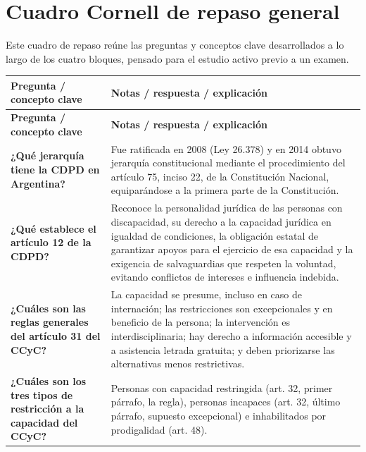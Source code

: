 \documentclass[12pt,oneside]{book}
\begin{document}
\section{Cuadro Cornell de repaso general}
\label{ch:cornell-general}

Este cuadro de repaso reúne las preguntas y conceptos clave desarrollados a lo largo de los cuatro bloques, pensado para el estudio activo previo a un examen.

\begin{longtable}{
    >{\raggedright\arraybackslash}p{}
    >{\raggedright\arraybackslash}p{}
}
\toprule
\textbf{Pregunta / concepto clave} & \textbf{Notas / respuesta / explicación} \\
\midrule
\endfirsthead
\toprule
\textbf{Pregunta / concepto clave} & \textbf{Notas / respuesta / explicación} \\
\midrule
\endhead

\textbf{¿Qué jerarquía tiene la CDPD en Argentina?} &
Fue ratificada en 2008 (Ley 26.378) y en 2014 obtuvo jerarquía constitucional mediante el procedimiento del artículo 75, inciso 22, de la Constitución Nacional, equiparándose a la primera parte de la Constitución. \\[0.4em]

\textbf{¿Qué establece el artículo 12 de la CDPD?} &
Reconoce la personalidad jurídica de las personas con discapacidad, su derecho a la capacidad jurídica en igualdad de condiciones, la obligación estatal de garantizar apoyos para el ejercicio de esa capacidad y la exigencia de salvaguardias que respeten la voluntad, evitando conflictos de intereses e influencia indebida. \\[0.4em]

\textbf{¿Cuáles son las reglas generales del artículo 31 del CCyC?} &
La capacidad se presume, incluso en caso de internación; las restricciones son excepcionales y en beneficio de la persona; la intervención es interdisciplinaria; hay derecho a información accesible y a asistencia letrada gratuita; y deben priorizarse las alternativas menos restrictivas. \\[0.4em]

\textbf{¿Cuáles son los tres tipos de restricción a la capacidad del CCyC?} &
Personas con capacidad restringida (art. 32, primer párrafo, la regla), personas incapaces (art. 32, último párrafo, supuesto excepcional) e inhabilitados por prodigalidad (art. 48). \\[0.4em]


\end{longtable}
\end{document}
